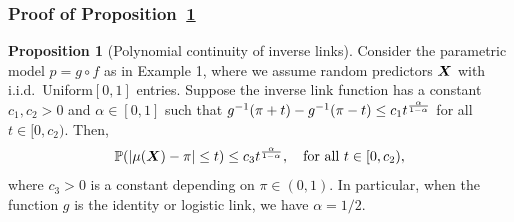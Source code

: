 \documentclass[11pt]{article}
\theoremstyle{plain}
\theoremstyle{definition}
\newtheorem{prop}{Proposition}
\begin{document}
\subsubsection{Proof of Proposition~\ref{prop:polynomial}}\label{sec:population}
\begin{prop}[Polynomial continuity of inverse links]\label{prop:polynomial}
Consider the parametric model $p=g\circ f$ as in Example 1, where we assume random predictors $\bm X$ with i.i.d.\ Uniform$[0,1]$ entries. Suppose the inverse link function has a constant $c_1,c_2>0$ and $\alpha\in[0,1]$ such that  $g^{-1}(\pi+t)-g^{-1}(\pi-t) \leq c_1 t^{\alpha\over 1-\alpha}$ for all $t\in[0,c_2)$. Then,
\begin{equation}\label{eq:concentration}
\mathbb{P}(|\mu(\bm X)-\pi|\leq t)\leq c_3t^{\alpha\over 1-\alpha}, \quad \text{for all  }t\in[0,c_2),
\end{equation}
where $c_3>0$ is a constant depending on $\pi\in(0,1)$. In particular, when the function $g$ is the identity or logistic link, we have $\alpha=1/2$.
\end{prop}
\end{document}
